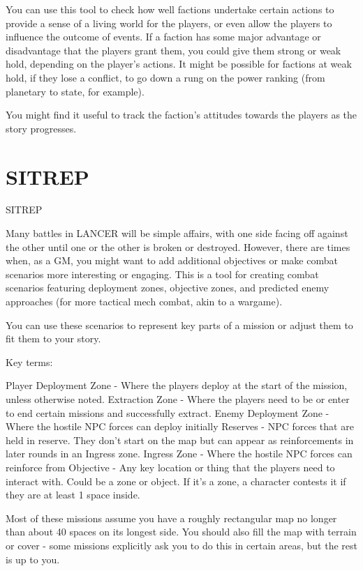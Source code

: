 You can use this tool to check how well factions undertake certain actions to provide a sense of a
living world for the players, or even allow the players to influence the outcome of events. If a
faction has some major advantage or disadvantage that the players grant them, you could give
them strong or weak hold, depending on the player’s actions. It might be possible for factions at
weak hold, if they lose a conflict, to go down a rung on the power ranking (from planetary to state,
for example).

You might find it useful to track the faction’s attitudes towards the players as the story progresses.

\chapter{SITREP}


                                              SITREP

Many battles in LANCER will be simple affairs, with one side facing off against the other until one
or the other is broken or destroyed. However, there are times when, as a GM, you might want to
add additional objectives or make combat scenarios more interesting or engaging. This is a tool
for creating combat scenarios featuring deployment zones, objective zones, and predicted enemy
approaches (for more tactical mech combat, akin to a wargame).

You can use these scenarios to represent key parts of a mission or adjust them to fit them to your
story.

Key terms:

Player Deployment Zone - Where the players deploy at the start of the mission, unless otherwise
noted.
Extraction Zone - Where the players need to be or enter to end certain missions and
successfully extract.
Enemy Deployment Zone - Where the hostile NPC forces can deploy initially
Reserves - NPC forces that are held in reserve. They don’t start on the map but can appear as
reinforcements in later rounds in an Ingress zone.
Ingress Zone - Where the hostile NPC forces can reinforce from
Objective - Any key location or thing that the players need to interact with. Could be a zone or
object. If it’s a zone, a character contests it if they are at least 1 space inside.

Most of these missions assume you have a roughly rectangular map no longer than about 40
spaces on its longest side. You should also fill the map with terrain or cover - some missions
explicitly ask you to do this in certain areas, but the rest is up to you.

